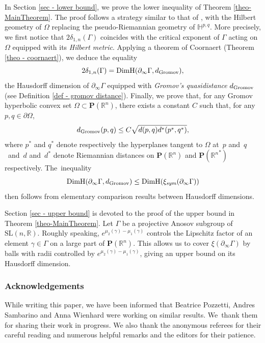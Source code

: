 \documentclass[JEP,XML,SOM,Unicode,NoEqCountersInSection,NoFloatCountersInSection,published]{cedram}
\theoremstyle{definition}
\newcommand{\proj}{\mathbf{P}}
\newcommand{\R}{\mathbb{R}}
\newcommand{\Hyp}{\mathbb{H}}
\newcommand{\SL}{\mathrm{SL}}
\DeclareMathOperator{\DimH}{DimH}
\begin{document}
In Section \ref{sec - lower bound}, we prove the lower inequality of Theorem \ref{theo-MainTheorem}. The proof follows a strategy similar to that of \cite{GM18}, with the Hilbert geometry of $\Omega$ replacing the pseudo-Riemannian geometry of $\Hyp^{p,q}$. More precisely, we first notice that $2\delta_{1,n}(\Gamma)$ coincides with the critical exponent of $\Gamma$ acting on $\Omega$ equipped with its \emph{Hilbert metric}. Applying a theorem of Coornaert (Theorem \ref{theo - coornaert}), we deduce the equality\vspace*{-3pt}
\[2\delta_{1,n}(\Gamma) = \DimH(\partial_\infty \Gamma, d_{\textup{Gromov}}),\]
the Hausdorff dimension of $\partial_\infty \Gamma$ equipped with \emph{Gromov's quasidistance} $d_{\textup{Gromov}}$ (see Definition \ref{def - gromov distance}). Finally, we prove that, for any Gromov hyperbolic convex set $\Omega \subset \proj(\R^n)$, there exists a constant $C$ such that, for any $p,q\in \partial \Omega$,\vspace*{-3pt}
\[d_{\textup{Gromov}}(p,q) \leq C \sqrt{d(p,q) d^*(p^*,q^*)},\]
where $p^*$ and $q^*$ denote respectively the hyperplanes tangent to $\Omega$ at~$p$ and~$q$~and~$d$ and~$d^*$ denote Riemannian distances on $\proj(\R^n)$ and $\proj({\R^n}^*)$ respectively. The~\hbox{inequality}\vspace*{-3pt}
\[\DimH(\partial_\infty \Gamma, d_{\textup{Gromov}}) \leq \DimH(\xi_{\textit{sym}}(\partial_\infty \Gamma))\]
then follows from elementary comparison results between Hausdorff dimensions.

Section \ref{sec - upper bound} is devoted to the proof of the upper bound in Theorem \ref{theo-MainTheorem}. Let $\Gamma$ be a projective Anosov subgroup of $\SL(n,\R)$. Roughly speaking, $e^{\mu_2(\gamma)-\mu_1(\gamma)}$ controls the Lipschitz factor of an element $\gamma \in \Gamma$ on a large part of $\proj(\R^n)$. This allows us to cover $\xi(\partial_\infty \Gamma)$ by balls with radii controlled by $e^{\mu_2(\gamma)-\mu_1(\gamma)}$, giving an upper bound on its Hausdorff dimension.

\subsubsection*{Acknowledgements}
While writing this paper, we have been informed that Beatrice Pozzetti, Andres Sambarino and Anna Wienhard were working on similar results. We~thank them for sharing their work in progress. We also thank the anonymous referees for their careful reading and numerous helpful remarks and the editors for their patience.
\end{document}
